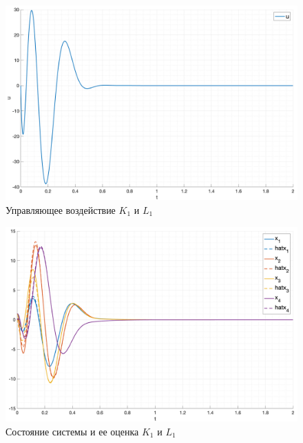 \begin{figure}[ht!]
    \centering
    \includegraphics[width=\textwidth]{media/plots/task2_1_u.png}
    \caption{Управляющее воздействие $K_1$ и $L_1$}
    \label{fig:task2_1_1_u}
\end{figure}
\begin{figure}[ht!]
    \centering
    \includegraphics[width=\textwidth]{media/plots/task2_1_xh.png}
    \caption{Состояние системы и ее оценка $K_1$ и $L_1$}
    \label{fig:task2_1_1_xh}
\end{figure}
\FloatBarrier

